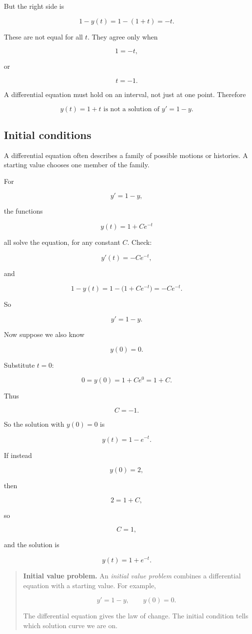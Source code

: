 But the right side is

\[
1-y(t)=1-(1+t)=-t.
\]

These are not equal for all \(t\).  They agree only when

\[
1=-t,
\]

or

\[
t=-1.
\]

A differential equation must hold on an interval, not just at one point.  Therefore

\[
\boxed{
y(t)=1+t \text{ is not a solution of } y'=1-y.
}
\]

\subsection{Initial conditions}
\label{subsec:initial-conditions}

A differential equation often describes a family of possible motions or histories.  A
starting value chooses one member of the family.

For

\[
y'=1-y,
\]

the functions

\[
y(t)=1+Ce^{-t}
\]

all solve the equation, for any constant \(C\).  Check:

\[
y'(t)=-Ce^{-t},
\]

and

\[
1-y(t)=1-\bigl(1+Ce^{-t}\bigr)=-Ce^{-t}.
\]

So

\[
y'=1-y.
\]

Now suppose we also know

\[
y(0)=0.
\]

Substitute \(t=0\):

\[
0=y(0)=1+Ce^0=1+C.
\]

Thus

\[
C=-1.
\]

So the solution with \(y(0)=0\) is

\[
\boxed{
y(t)=1-e^{-t}.
}
\]

If instead

\[
y(0)=2,
\]

then

\[
2=1+C,
\]

so

\[
C=1,
\]

and the solution is

\[
\boxed{
y(t)=1+e^{-t}.
}
\]

\begin{quote}
\textbf{Initial value problem.}
An \emph{initial value problem} combines a differential equation with a starting value.
For example,

\[
y'=1-y,
\qquad
y(0)=0.
\]

The differential equation gives the law of change.  The initial condition tells which
solution curve we are on.
\end{quote}

